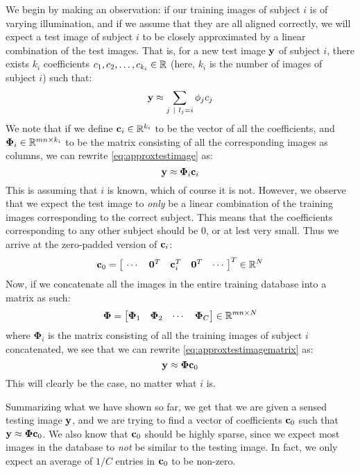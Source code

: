 We begin by making an observation: if our training images of subject $ i $ is of varying illumination, and if we assume that they are all aligned correctly, we will expect a test image of subject $ i $ to be closely approximated by a linear combination of the test images. That is, for a new test image $ \mathbf{y} $ of subject $ i $, there exists $ k_{i} $ coefficients $ c_{1}, c_{2}, \ldots, c_{k_{i}}  \in \mathbb{R} $ (here, $ k_{i} $ is the number of images of subject $ i $) such that:
\begin{equation}
	\label{eq:approxtestimage}
	\mathbf{y} \approx \sum_{j ~|~ l_{j} = i} \phi_{j}c_{j}
\end{equation}We note that if we define $ \mathbf{c}_{i} \in \mathbb{R}^{k_{i}} $ to be the vector of all the coefficients, and $ \mathbf{\Phi}_{i} \in \mathbb{R}^{mn \times k_{i}} $ to be the matrix consisting of all the corresponding images as columns, we can rewrite \eqref{eq:approxtestimage} as:
\begin{equation}
	\label{eq:approxtestimagematrix}
	\mathbf{y} \approx \mathbf{\Phi}_{i}\mathbf{c}_{i}
\end{equation}
This is assuming that $ i $ is known, which of course it is not. However, we observe that we expect the test image to \textit{only} be a linear combination of the training images corresponding to the correct subject. This means that the coefficients corresponding to any other subject should be $ 0 $, or at lest very small. Thus we arrive at the zero-padded version of $ \mathbf{c}_{i} $:
\begin{equation*}
	\label{eq:c0def}
	\mathbf{c}_{0} = \begin{bmatrix}~\cdots & \mathbf{0}^{T} & \mathbf{c}_{i}^{T} & \mathbf{0}^{T} & \cdots~\end{bmatrix}^{T} \in \mathbb{R}^{N}
\end{equation*}
Now, if we concatenate all the images in the entire training database into a matrix as such:
\[
	\mathbf{\Phi} = \begin{bmatrix}\mathbf{\Phi}_{1} & \mathbf{\Phi}_{2} & \cdots & \mathbf{\Phi}_{C}\end{bmatrix} \in \mathbb{R}^{mn \times N}
\]
where $ \mathbf{\Phi}_{i} $ is the matrix consisting of all the training images of subject $ i $ concat\-enated, we see that we can rewrite \eqref{eq:approxtestimagematrix} as:
\begin{equation}
	\label{eq:approxtestimagefinal}
	\mathbf{y} \approx \mathbf{\Phi}\mathbf{c}_{0}
\end{equation}
This will clearly be the case, no matter what $ i $ is. 

Summarizing what we have shown so far, we get that we are given a sensed testing image $ \mathbf{y} $, and we are trying to find a vector of coefficients $ \mathbf{c}_{0} $ such that $ \mathbf{y} \approx \mathbf{\Phi}\mathbf{c}_{0} $. We also know that $ \mathbf{c}_{0} $ should be highly sparse, since we expect most images in the database to \textit{not} be similar to the testing image. In fact, we only expect an average of $ 1/C $ entries in $ \mathbf{c}_{0} $ to be non-zero. 

